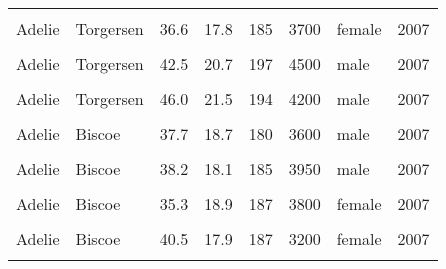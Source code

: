 \documentclass[
  landscape]{article}
\begin{document}
\begin{longtable}[l]{llllllll}
\cellcolor{gray!15}{Adelie} & \cellcolor{gray!15}{Torgersen} & \cellcolor{gray!15}{34.6} & \cellcolor{gray!15}{21.1} & \cellcolor{gray!15}{198} & \cellcolor{gray!15}{4400} & \cellcolor{gray!15}{male} & \cellcolor{gray!15}{2007}\\
Adelie & Torgersen & 36.6 & 17.8 & 185 & 3700 & female & 2007\\
\cellcolor{gray!15}{Adelie} & \cellcolor{gray!15}{Torgersen} & \cellcolor{gray!15}{38.7} & \cellcolor{gray!15}{19.0} & \cellcolor{gray!15}{195} & \cellcolor{gray!15}{3450} & \cellcolor{gray!15}{female} & \cellcolor{gray!15}{2007}\\
Adelie & Torgersen & 42.5 & 20.7 & 197 & 4500 & male & 2007\\
\cellcolor{gray!15}{Adelie} & \cellcolor{gray!15}{Torgersen} & \cellcolor{gray!15}{34.4} & \cellcolor{gray!15}{18.4} & \cellcolor{gray!15}{184} & \cellcolor{gray!15}{3325} & \cellcolor{gray!15}{female} & \cellcolor{gray!15}{2007}\\
Adelie & Torgersen & 46.0 & 21.5 & 194 & 4200 & male & 2007\\
\cellcolor{gray!15}{Adelie} & \cellcolor{gray!15}{Biscoe} & \cellcolor{gray!15}{37.8} & \cellcolor{gray!15}{18.3} & \cellcolor{gray!15}{174} & \cellcolor{gray!15}{3400} & \cellcolor{gray!15}{female} & \cellcolor{gray!15}{2007}\\
Adelie & Biscoe & 37.7 & 18.7 & 180 & 3600 & male & 2007\\
\cellcolor{gray!15}{Adelie} & \cellcolor{gray!15}{Biscoe} & \cellcolor{gray!15}{35.9} & \cellcolor{gray!15}{19.2} & \cellcolor{gray!15}{189} & \cellcolor{gray!15}{3800} & \cellcolor{gray!15}{female} & \cellcolor{gray!15}{2007}\\
Adelie & Biscoe & 38.2 & 18.1 & 185 & 3950 & male & 2007\\
\cellcolor{gray!15}{Adelie} & \cellcolor{gray!15}{Biscoe} & \cellcolor{gray!15}{38.8} & \cellcolor{gray!15}{17.2} & \cellcolor{gray!15}{180} & \cellcolor{gray!15}{3800} & \cellcolor{gray!15}{male} & \cellcolor{gray!15}{2007}\\
Adelie & Biscoe & 35.3 & 18.9 & 187 & 3800 & female & 2007\\
\cellcolor{gray!15}{Adelie} & \cellcolor{gray!15}{Biscoe} & \cellcolor{gray!15}{40.6} & \cellcolor{gray!15}{18.6} & \cellcolor{gray!15}{183} & \cellcolor{gray!15}{3550} & \cellcolor{gray!15}{male} & \cellcolor{gray!15}{2007}\\
Adelie & Biscoe & 40.5 & 17.9 & 187 & 3200 & female & 2007\\
\cellcolor{gray!15}{Adelie} & \cellcolor{gray!15}{Biscoe} & \cellcolor{gray!15}{37.9} & \cellcolor{gray!15}{18.6} & \cellcolor{gray!15}{172} & \cellcolor{gray!15}{3150} & \cellcolor{gray!15}{female} & \cellcolor{gray!15}{2007}\\

\end{longtable}
\end{document}
